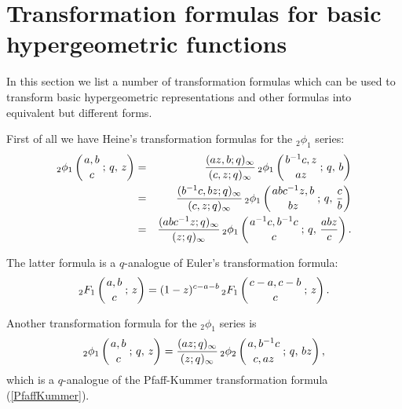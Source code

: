 \documentclass[envcountchap,graybox]{svmono}
\newcommand{\hyp}[5]{\mbox{}_{#1}{F}_{#2}
\left(\genfrac{}{}{0pt}{}{#3}{#4}\,;\,#5\right)}
\newcommand{\qhyp}[5]{\mbox{}_{#1}{\phi}_{#2}
\left(\genfrac{}{}{0pt}{}{#3}{#4}\,;\,q,\,#5\right)}
\begin{document}
\section{Transformation formulas for basic hypergeometric functions}
\par\setcounter{equation}{0}
\label{qtransformation formulas}

In this section we list a number of transformation formulas which can be used to
transform basic hypergeometric representations and other formulas into equivalent
but different forms.

First of all we have Heine's transformation formulas for the ${}_2\phi_1$ series:
\begin{eqnarray}
\label{Heine1}\index{Heine's transformation formula}\index{Transformation formula!Heine}
\qhyp{2}{1}{a,b}{c}{z}&=&\frac{(az,b;q)_{\infty}}{(c,z;q)_{\infty}}\,
\qhyp{2}{1}{b^{-1}c,z}{az}{b}\\
&=&\frac{(b^{-1}c,bz;q)_{\infty}}{(c,z;q)_{\infty}}\,
\qhyp{2}{1}{abc^{-1}z,b}{bz}{\frac{c}{b}}\label{Heine2}\\
&=&\frac{(abc^{-1}z;q)_{\infty}}{(z;q)_{\infty}}\,
\qhyp{2}{1}{a^{-1}c,b^{-1}c}{c}{\frac{abz}{c}}.\label{Heine3}
\end{eqnarray}

The latter formula is a $q$-analogue of Euler's transformation formula:
\begin{equation}
\label{qEulertrans}
\index{q-Euler transformation formula@$q$-Euler transformation formula}
\index{Transformation formula!q-Euler@$q$-Euler}
\hyp{2}{1}{a,b}{c}{z}=(1-z)^{c-a-b}\,\hyp{2}{1}{c-a,c-b}{c}{z}.
\end{equation}

Another transformation formula for the ${}_2\phi_1$ series is
\begin{equation}
\label{qPfaffKummer}
\index{q-Pfaff-Kummer transformation formula@$q$-Pfaff-Kummer transformation formula}
\index{Transformation formula!q-Pfaff-Kummer@$q$-Pfaff-Kummer}
\qhyp{2}{1}{a,b}{c}{z}=\frac{(az;q)_{\infty}}{(z;q)_{\infty}}\,
\qhyp{2}{2}{a,b^{-1}c}{c,az}{bz},
\end{equation}
which is a $q$-analogue of the Pfaff-Kummer transformation formula (\ref{PfaffKummer}).
\end{document}
